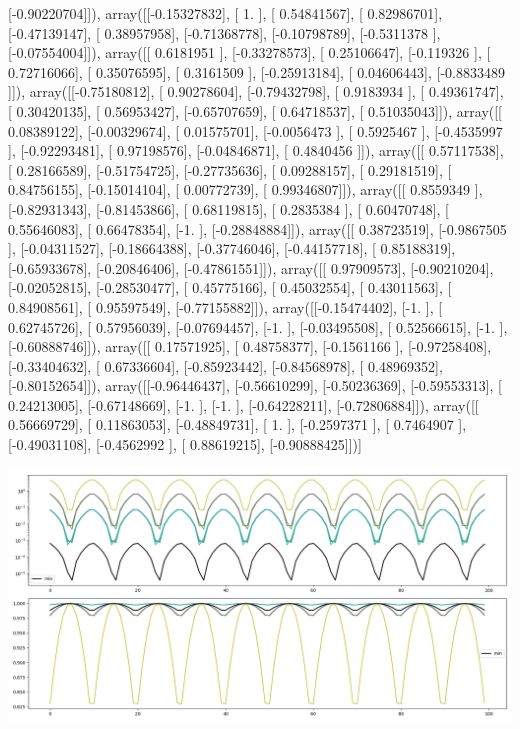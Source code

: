 \documentclass{article}
\begin{document}
       [-0.90220704]]), array([[-0.15327832],
       [ 1.        ],
       [ 0.54841567],
       [ 0.82986701],
       [-0.47139147],
       [ 0.38957958],
       [-0.71368778],
       [-0.10798789],
       [-0.5311378 ],
       [-0.07554004]]), array([[ 0.6181951 ],
       [-0.33278573],
       [ 0.25106647],
       [-0.119326  ],
       [ 0.72716066],
       [ 0.35076595],
       [ 0.3161509 ],
       [-0.25913184],
       [ 0.04606443],
       [-0.8833489 ]]), array([[-0.75180812],
       [ 0.90278604],
       [-0.79432798],
       [ 0.9183934 ],
       [ 0.49361747],
       [ 0.30420135],
       [ 0.56953427],
       [-0.65707659],
       [ 0.64718537],
       [ 0.51035043]]), array([[ 0.08389122],
       [-0.00329674],
       [ 0.01575701],
       [-0.0056473 ],
       [ 0.5925467 ],
       [-0.4535997 ],
       [-0.92293481],
       [ 0.97198576],
       [-0.04846871],
       [ 0.4840456 ]]), array([[ 0.57117538],
       [ 0.28166589],
       [-0.51754725],
       [-0.27735636],
       [ 0.09288157],
       [ 0.29181519],
       [ 0.84756155],
       [-0.15014104],
       [ 0.00772739],
       [ 0.99346807]]), array([[ 0.8559349 ],
       [-0.82931343],
       [-0.81453866],
       [ 0.68119815],
       [ 0.2835384 ],
       [ 0.60470748],
       [ 0.55646083],
       [ 0.66478354],
       [-1.        ],
       [-0.28848884]]), array([[ 0.38723519],
       [-0.9867505 ],
       [-0.04311527],
       [-0.18664388],
       [-0.37746046],
       [-0.44157718],
       [ 0.85188319],
       [-0.65933678],
       [-0.20846406],
       [-0.47861551]]), array([[ 0.97909573],
       [-0.90210204],
       [-0.02052815],
       [-0.28530477],
       [ 0.45775166],
       [ 0.45032554],
       [ 0.43011563],
       [ 0.84908561],
       [ 0.95597549],
       [-0.77155882]]), array([[-0.15474402],
       [-1.        ],
       [ 0.62745726],
       [ 0.57956039],
       [-0.07694457],
       [-1.        ],
       [-0.03495508],
       [ 0.52566615],
       [-1.        ],
       [-0.60888746]]), array([[ 0.17571925],
       [ 0.48758377],
       [-0.1561166 ],
       [-0.97258408],
       [-0.33404632],
       [ 0.67336604],
       [-0.85923442],
       [-0.84568978],
       [ 0.48969352],
       [-0.80152654]]), array([[-0.96446437],
       [-0.56610299],
       [-0.50236369],
       [-0.59553313],
       [ 0.24213005],
       [-0.67148669],
       [-1.        ],
       [-1.        ],
       [-0.64228211],
       [-0.72806884]]), array([[ 0.56669729],
       [ 0.11863053],
       [-0.48849731],
       [ 1.        ],
       [-0.2597371 ],
       [ 0.7464907 ],
       [-0.49031108],
       [-0.4562992 ],
       [ 0.88619215],
       [-0.90888425]])]
\begin{center}
\includegraphics[scale=.9]{control_dpn_all.png}

\end{center}
\end{document}
